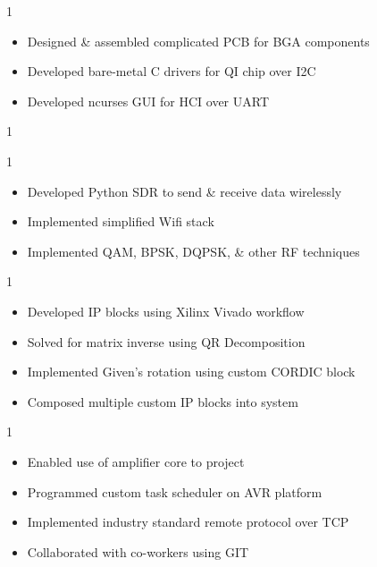 \documentclass[10pt, letterpaper, ragged2e, withhyper]{AltaCV/altacv}
\def\RUWPTRX{1}		%
\def\RUSDR{1}		%
\def\RUXILINX{0}	%
\def\RSEAMP{1}		%
\begin{document}
\begin{paracol}{2}
\if\RUWPTRX1
\begin{itemize}
\item Designed \& assembled complicated PCB for BGA components
\item Developed bare-metal C drivers for QI chip over I2C
\item Developed ncurses GUI for HCI over UART
\end{itemize}
\fi

\if\RUSDR1

\if\RUWPTRX1
\divider
\fi

\begin{itemize}
\item Developed Python SDR to send \& receive data wirelessly
\item Implemented simplified Wifi stack
\item Implemented QAM, BPSK, DQPSK, \& other RF techniques
\end{itemize}
\fi

\if\RUXILINX1


\begin{itemize}
\item Developed IP blocks using Xilinx Vivado workflow
\item Solved for matrix inverse using QR Decomposition
\item Implemented Given's rotation using custom CORDIC block
\item Composed multiple custom IP blocks into system
\end{itemize}
\fi

\if\RSEAMP1
\divider
{}
\begin{itemize}
\item Enabled use of amplifier core to project
\item Programmed custom task scheduler on AVR platform
\item Implemented industry standard remote protocol over TCP
\item Collaborated with co-workers using GIT
\end{itemize}
\fi


\end{paracol}
\end{document}
